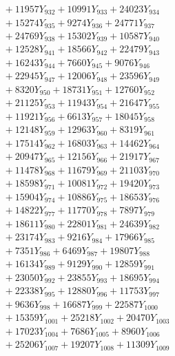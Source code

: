 \documentclass[a4paper,10pt]{article}
\begin{document}
{\begin{align}
&\;  + 11957 Y_{932} + 10991 Y_{933} + 24023 Y_{934} \\[0.3ex]
&\;  + 15274 Y_{935} + 9274 Y_{936} + 24771 Y_{937} \\[0.3ex]
&\;  + 24769 Y_{938} + 15302 Y_{939} + 10587 Y_{940} \\[0.3ex]
&\;  + 12528 Y_{941} + 18566 Y_{942} + 22479 Y_{943} \\[0.3ex]
&\;  + 16243 Y_{944} + 7660 Y_{945} + 9076 Y_{946} \\[0.3ex]
&\;  + 22945 Y_{947} + 12006 Y_{948} + 23596 Y_{949} \\[0.3ex]
&\;  + 8320 Y_{950} + 18731 Y_{951} + 12760 Y_{952} \\[0.3ex]
&\;  + 21125 Y_{953} + 11943 Y_{954} + 21647 Y_{955} \\[0.3ex]
&\;  + 11921 Y_{956} + 6613 Y_{957} + 18045 Y_{958} \\[0.5ex]\allowbreak
&\;  + 12148 Y_{959} + 12963 Y_{960} + 8319 Y_{961} \\[0.3ex]
&\;  + 17514 Y_{962} + 16803 Y_{963} + 14462 Y_{964} \\[0.3ex]
&\;  + 20947 Y_{965} + 12156 Y_{966} + 21917 Y_{967} \\[0.3ex]
&\;  + 11478 Y_{968} + 11679 Y_{969} + 21103 Y_{970} \\[0.3ex]
&\;  + 18598 Y_{971} + 10081 Y_{972} + 19420 Y_{973} \\[0.3ex]
&\;  + 15904 Y_{974} + 10886 Y_{975} + 18653 Y_{976} \\[0.3ex]
&\;  + 14822 Y_{977} + 11770 Y_{978} + 7897 Y_{979} \\[0.3ex]
&\;  + 18611 Y_{980} + 22801 Y_{981} + 24639 Y_{982} \\[0.3ex]
&\;  + 23174 Y_{983} + 9216 Y_{984} + 17966 Y_{985} \\[0.3ex]
&\;  + 7351 Y_{986} + 6469 Y_{987} + 19807 Y_{988} \\[0.5ex]\allowbreak
&\;  + 16134 Y_{989} + 9129 Y_{990} + 12859 Y_{991} \\[0.3ex]
&\;  + 23050 Y_{992} + 23855 Y_{993} + 18695 Y_{994} \\[0.3ex]
&\;  + 22338 Y_{995} + 12880 Y_{996} + 11753 Y_{997} \\[0.3ex]
&\;  + 9636 Y_{998} + 16687 Y_{999} + 22587 Y_{1000} \\[0.3ex]
&\;  + 15359 Y_{1001} + 25218 Y_{1002} + 20470 Y_{1003} \\[0.3ex]
&\;  + 17023 Y_{1004} + 7686 Y_{1005} + 8960 Y_{1006} \\[0.3ex]
&\;  + 25206 Y_{1007} + 19207 Y_{1008} + 11309 Y_{1009} \\[0.3ex]

\end{align}}
\end{document}
